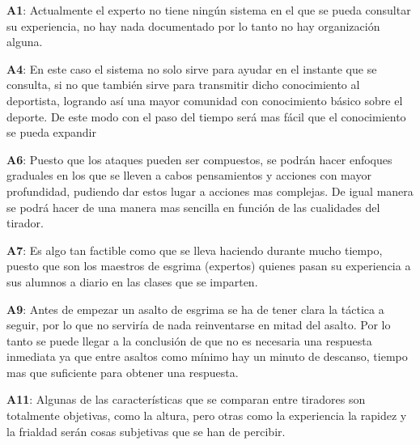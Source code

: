 \begin{compactitem}
  \item[\textbf{A1}:] Actualmente el experto no tiene ningún sistema en el que
     se pueda consultar su experiencia, no hay nada documentado por lo tanto no
     hay organización alguna.
  \item[\textbf{A4}:] En este caso el sistema no solo sirve para ayudar en el
     instante que se consulta, si no que también sirve para transmitir dicho
     conocimiento al deportista, logrando así una mayor comunidad con
     conocimiento básico sobre el deporte. De este modo con el paso del tiempo
     será mas fácil que el conocimiento se pueda expandir
  \item[\textbf{A6}:] Puesto que los ataques pueden ser compuestos, se podrán
     hacer enfoques graduales en los que se lleven a cabos pensamientos y
     acciones con mayor profundidad, pudiendo dar estos lugar a acciones mas
     complejas. De igual manera se podrá hacer de una manera mas sencilla
     en función de las cualidades del tirador.
  \item[\textbf{A7}:] Es algo tan factible como que se lleva haciendo durante
     mucho tiempo, puesto que son los maestros de esgrima (expertos) quienes
     pasan su experiencia a sus alumnos a diario en las clases que se imparten.
  \item[\textbf{A9}:] Antes de empezar un asalto de esgrima se ha de tener
     clara la táctica a seguir, por lo que no serviría de nada reinventarse
     en mitad del asalto. Por lo tanto se puede llegar a la conclusión de que
     no es necesaria una respuesta inmediata ya que entre asaltos como mínimo
     hay un minuto de descanso, tiempo mas que suficiente para obtener una respuesta.
  \item[\textbf{A11}:] Algunas de las características que se comparan entre
     tiradores son totalmente objetivas, como la altura, pero otras como la experiencia
     la rapidez y la frialdad serán cosas subjetivas que se han de percibir.
\end{compactitem}

